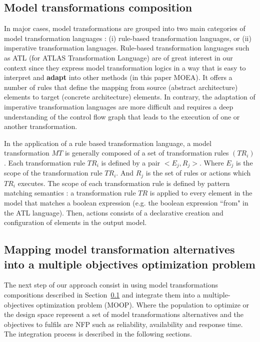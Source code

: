 \documentclass[conference]{IEEEtran}
\begin{document}
\subsection{Model transformations composition}
\label{transfos}
In major cases, model transformations are grouped into two main categories of model transformation languages : (i) rule-based transformation languages, or (ii) imperative transformation languages\cite{Gorp06integratinga}. Rule-based transformation languages such as ATL (for ATLAS Transformation Language) are of great interest in our context since they express model transformation logics in a way that is easy to interpret and \textbf{adapt} into other methods (in this paper MOEA). It offers a number of rules that define the mapping from source (abstract architecture) elements to target (concrete architecture) elements. In contrary, the adaptation of imperative transformation languages are more difficult and requires a deep understanding of the control flow graph that leads to the execution of one or another transformation.

In the application of a rule based transformation language, a model transformation $MT$ is generally composed of a set of transformation rules $(TR_{i})$.
Each transformation rule $TR_{i}$ is defined by a pair $<E_{j},R_{j}>$. Where $E_{j}$ is the scope of the transformation rule $TR_{i}$. And $R_{j}$ is the set of rules or actions which $TR_{i}$ executes. The scope of each transformation rule is defined by pattern matching semantics : a transformation rule $TR$ is applied to every element in the model that matches a boolean expression (e.g. the boolean expression ``from" in the ATL language). Then, actions consists of a declarative creation and configuration of elements in the output model.

\subsection{Mapping model transformation alternatives into a multiple objectives optimization problem}
\label{Adapting}
The next step of our approach consist in using model transformations compositions described in Section~\ref{transfos} and integrate them into a multiple-objectives optimization problem (MOOP). Where the population to optimize or the design space represent a set of model transformations alternatives and the objectives to fulfils are NFP such as reliability, availability and response time. The integration process is described in the following sections.
\end{document}
